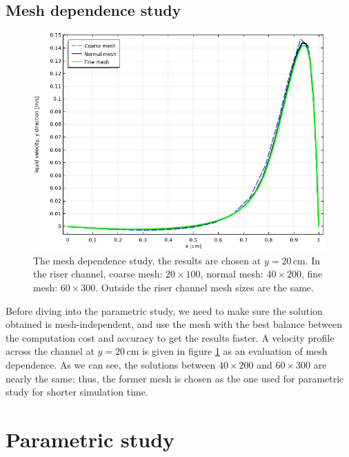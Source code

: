  

 
 
 \subsection{Mesh dependence study}
 
    \begin{figure}[H]
     \centering
     \includegraphics[scale = 0.7]{meshdependencecirculating.png}
     \caption{The mesh dependence study, the results are chosen at $y = 20 \, \mathrm{cm}$. In the riser channel, coarse mesh: $20 \times 100$, normal mesh: $40 \times 200$, fine mesh: $60 \times 300$. Outside the riser channel mesh sizes are the same.}
     \label{meshdependececirculating}
 \end{figure}
 
 Before diving into the parametric study, we need to make sure the solution obtained is mesh-independent, and use the mesh with the best balance between the computation cost and accuracy to get the results faster. A velocity profile across the channel at $y = 20 \, \mathrm{cm}$ is given in figure \ref{meshdependececirculating} as an evaluation of mesh dependence. As we can see, the solutions between $40 \times 200$ and $60 \times 300$ are nearly the same; thus, the former mesh is chosen as the one used for parametric study for shorter simulation time.
 


\section{Parametric study}

